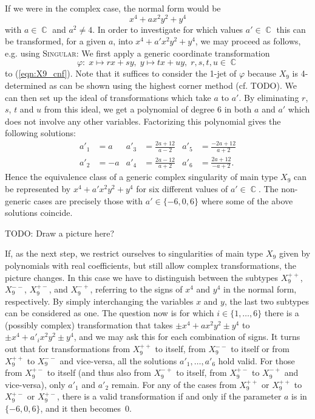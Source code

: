 \documentclass[noend]{amsproc}
\newcommand{\Singular}{\textsc{Singular}}
\DeclareMathOperator{\C}{\mathbb{C}}
\begin{document}
If we were in the complex case, the normal form would be
\begin{equation}\label{eqn:X9_cnf}
x^4 +ax^2y^2 +y^4
\end{equation}
with $a \in \C$ and $a^2 \neq 4$. In order to investigate for which values
$a' \in \C$ this can be transformed, for a given $a$, into
$x^4 +a'x^2y^2 +y^4$, we may proceed as follows, e.g. using \Singular:
We first apply a generic coordinate transformation
\[
\varphi: \; x \mapsto rx+sy, \; y \mapsto tx+uy, \; r,s,t,u \in \C
\]
to (\ref{eqn:X9_cnf}). Note that it suffices to consider the 1-jet of $\varphi$
because $X_9$ is 4-determined as can be shown using the highest corner method
(cf. TODO). We can then set up the ideal of transformations which take $a$ to
$a'$. By eliminating $r$, $s$, $t$ and $u$ from this ideal, we get a polynomial
of degree 6 in both $a$ and $a'$ which does not involve any other variables.
Factorizing this polynomial gives the following solutions:
\begin{align*}
a'_1 &= a  & a'_3 &= \frac{2a+12}{a-2} & a'_5 &= \frac{-2a+12}{a+2} \\
a'_2 &= -a & a'_4 &= \frac{2a-12}{a+2} & a'_6 &= \frac{2a+12}{-a+2}.
\end{align*}
Hence the equivalence class of a generic complex singularity of main type $X_9$
can be represented by $x^4 +a'x^2y^2 +y^4$ for six different values of
$a' \in \C$. The non-generic cases are precisely those with
$a' \in \{-6, 0, 6\}$ where some of the above solutions coincide.

TODO: Draw a picture here?

If, as the next step, we restrict ourselves to singularities of main type $X_9$
given by polynomials with real coefficients, but still allow complex
transformations, the picture changes. In this case we have to distinguish
between the subtypes $X_9^{++}$, $X_9^{--}$, $X_9^{+-}$, and $X_9^{-+}$,
referring to the signs of $x^4$ and $y^4$ in the normal form, respectively. By
simply interchanging the variables $x$ and $y$, the last two subtypes can be
considered as one.
The question now is for which $i \in \{1, \ldots, 6\}$ there is a (possibly
complex) transformation that takes
$\pm x^4 +ax^2y^2 \pm y^4$ to $\pm x^4 +a'_i x^2y^2 \pm y^4$, and we may
ask this for each combination of signs.
It turns out that for transformations from $X_9^{++}$ to itself, from
$X_9^{--}$ to itself or from $X_9^{++}$ to $X_9^{--}$ and vice-versa, all the
solutions $a'_1, \ldots, a'_6$ hold valid. For those from $X_9^{+-}$ to
itself (and thus also from $X_9^{-+}$ to itself, from $X_9^{+-}$ to
$X_9^{-+}$
and vice-versa), only $a'_1$ and $a'_2$ remain. For any of the cases from
$X_9^{++}$ or $X_9^{++}$ to $X_9^{+-}$ or $X_9^{+-}$, there is a valid
transformation if and only if the parameter $a$ is in $\{-6, 0, 6\}$, and it
then becomes~$0$.
\end{document}
